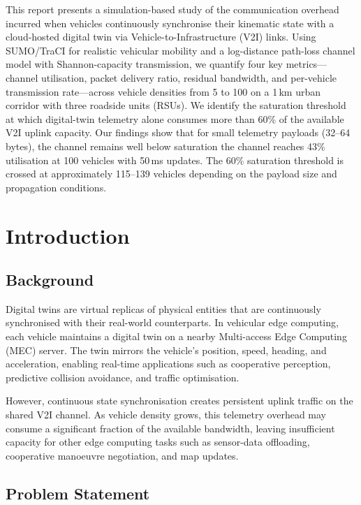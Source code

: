 \documentclass[12pt, a4paper]{article}
\begin{document}
This report presents a simulation-based study of the communication overhead
incurred when vehicles continuously synchronise their kinematic state with a
cloud-hosted digital twin via Vehicle-to-Infrastructure (V2I) links.  Using
SUMO/TraCI for realistic vehicular mobility and a log-distance path-loss
channel model with Shannon-capacity transmission, we quantify four key
metrics---channel utilisation, packet delivery ratio, residual bandwidth, and
per-vehicle transmission rate---across vehicle densities from 5 to 100 on a
1\,km urban corridor with three roadside units (RSUs).  We identify the
saturation threshold at which digital-twin telemetry alone consumes more than
60\% of the available V2I uplink capacity.  Our findings show that for small
telemetry payloads (32--64 bytes), the channel remains well below saturation
the channel reaches 43\% utilisation at 100 vehicles with 50\,ms updates.
The 60\% saturation threshold is crossed at approximately 115--139 vehicles
depending on the payload size and propagation conditions.

\section{Introduction}

\subsection{Background}

Digital twins are virtual replicas of physical entities that are continuously
synchronised with their real-world counterparts.  In vehicular edge computing,
each vehicle maintains a digital twin on a nearby Multi-access Edge Computing
(MEC) server.  The twin mirrors the vehicle's position, speed, heading, and
acceleration, enabling real-time applications such as cooperative perception,
predictive collision avoidance, and traffic optimisation.

However, continuous state synchronisation creates persistent uplink traffic on
the shared V2I channel.  As vehicle density grows, this telemetry overhead may
consume a significant fraction of the available bandwidth, leaving insufficient
capacity for other edge computing tasks such as sensor-data offloading,
cooperative manoeuvre negotiation, and map updates.

\subsection{Problem Statement}
\end{document}
